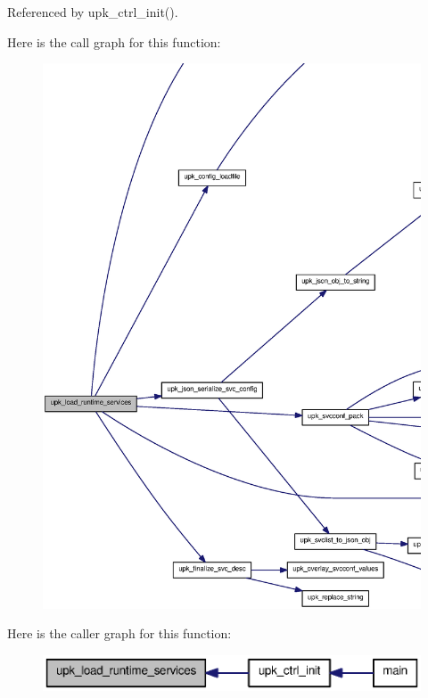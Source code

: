Referenced by upk\_\-ctrl\_\-init().



Here is the call graph for this function:
\nopagebreak
\begin{figure}[H]
\begin{center}
\leavevmode
\includegraphics[width=400pt]{group__functions_gaad96df378fe382df9bb37e2f21b62ee9_cgraph}
\end{center}
\end{figure}




Here is the caller graph for this function:\nopagebreak
\begin{figure}[H]
\begin{center}
\leavevmode
\includegraphics[width=360pt]{group__functions_gaad96df378fe382df9bb37e2f21b62ee9_icgraph}
\end{center}
\end{figure}


